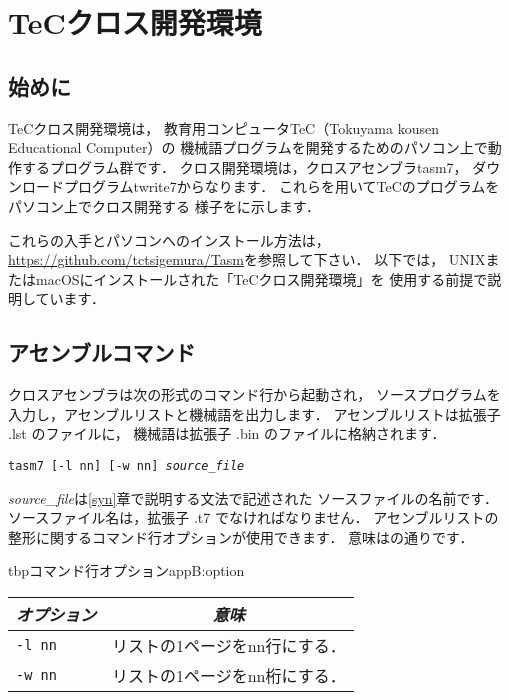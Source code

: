 \renewcommand{\myincludegraphics}[2]{\texttt{[image: appB/\#1]}}

\newpage
\chapter{TeCクロス開発環境}
\label{cross}
\section{始めに}
TeCクロス開発環境は，
教育用コンピュータTeC（Tokuyama kousen Educational Computer）の
機械語プログラムを開発するためのパソコン上で動作するプログラム群です．
クロス開発環境は，クロスアセンブラtasm7，
ダウンロードプログラムtwrite7からなります．
これらを用いてTeCのプログラムをパソコン上でクロス開発する
様子をに示します．

これらの入手とパソコンへのインストール方法は，
\url{https://github.com/tctsigemura/Tasm}を参照して下さい．
以下では，
UNIXまたはmacOSにインストールされた「TeCクロス開発環境」を
使用する前提で説明しています．


\section{アセンブルコマンド}
クロスアセンブラは次の形式のコマンド行から起動され，
ソースプログラムを入力し，アセンブルリストと機械語を出力します．
アセンブルリストは拡張子 .lst のファイルに，
機械語は拡張子 .bin のファイルに格納されます．

\begin{center}
{\small\tt tasm7 [-l nn] [-w nn] {\it source\_file} }
\end{center}

{\it source\_file}は\ref{syn}章で説明する文法で記述された
ソースファイルの名前です．
ソースファイル名は，拡張子 .t7 でなければなりません．
アセンブルリストの整形に関するコマンド行オプションが使用できます．
意味はの通りです．

\begin{mytable}{tbp}{コマンド行オプション}{appB:option}
{\small\begin{tabular}{l | l} \hline\hline
\multicolumn{1}{c|}{\it オプション} & \multicolumn{1}{c}{\it 意味} \\ \hline
{\tt -l nn}  &  リストの1ページをnn行にする． \\
{\tt -w nn}  &  リストの1ページをnn桁にする．
\end{tabular}}
\end{mytable}


